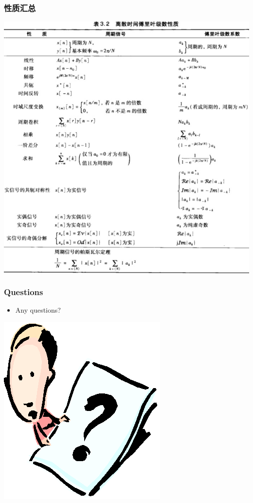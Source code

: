 \documentclass[CJKutf8,xcolor=pdftex,dvipsnames,table]{beamer}
\begin{document}
\begin{CJK*}{UTF8}{song}
  \begin{frame}
    \frametitle{性质汇总}
    \begin{center}
      \includegraphics[scale=.33]{ss-c-t3-2}
    \end{center}
  \end{frame}   
  
  \begin{frame}
    \frametitle{Questions}
    \begin{itemize}
    \item Any questions?
    \end{itemize}
    \begin{center}
      \includegraphics[scale=.5]{question}
    \end{center}
  \end{frame} 
    

\end{CJK*}
\end{document}

